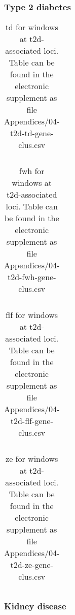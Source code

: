 \documentclass[twoside,openright]{report}
\begin{document}
\begin{appendices}
\FloatBarrier

\subsubsection{Type 2 diabetes}\label{type-2-diabetes}

\begin{table}[!htb]
\caption[\gls{td} for windows at \gls{t2d}-associated loci.]{\gls{td} for windows at \gls{t2d}-associated loci. Table can be found in the electronic supplement as file Appendices/04-t2d-td-gene-clus.csv}
\centering
  \begin{tabular}{l l}
  \end{tabular}
  \label{tab:t2dtdgeneclus}
\end{table}

\begin{table}[!htb]
\caption[\gls{fwh} for windows at \gls{t2d}-associated loci.]{\gls{fwh} for windows at \gls{t2d}-associated loci. Table can be found in the electronic supplement as file Appendices/04-t2d-fwh-gene-clus.csv}
\centering
  \begin{tabular}{l l}
  \end{tabular}
  \label{tab:t2dfwhgeneclus}
\end{table}

\begin{table}[!htb]
\caption[\gls{flf} for windows at \gls{t2d}-associated loci.]{\gls{flf} for windows at \gls{t2d}-associated loci. Table can be found in the electronic supplement as file Appendices/04-t2d-flf-gene-clus.csv}
\centering
  \begin{tabular}{l l}
  \end{tabular}
  \label{tab:t2dflfgeneclus}
\end{table}

\begin{table}[!htb]
\caption[\gls{ze} for windows at \gls{t2d}-associated loci.]{\gls{ze} for windows at \gls{t2d}-associated loci. Table can be found in the electronic supplement as file Appendices/04-t2d-ze-gene-clus.csv}
\centering
  \begin{tabular}{l l}
  \end{tabular}
  \label{tab:t2dzegeneclus}
\end{table}

\FloatBarrier

\subsubsection{Kidney disease}\label{kidney-disease}


\end{appendices}
\end{document}
